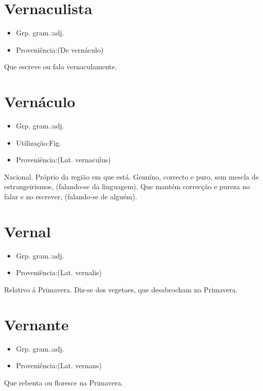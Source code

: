 \documentclass{article}
\begin{document}
\section{Vernaculista}
\begin{itemize}
\item {Grp. gram.:adj.}
\end{itemize}
\begin{itemize}
\item {Proveniência:(De \textunderscore vernáculo\textunderscore )}
\end{itemize}
Que escreve ou fala vernaculamente.
\section{Vernáculo}
\begin{itemize}
\item {Grp. gram.:adj.}
\end{itemize}
\begin{itemize}
\item {Utilização:Fig.}
\end{itemize}
\begin{itemize}
\item {Proveniência:(Lat. \textunderscore vernaculus\textunderscore )}
\end{itemize}
Nacional.
Próprio da região em que está.
Genuíno, correcto e puro, sem mescla de estrangeirismos, (falando-se da linguagem).
Que mantém correcção e pureza no falar e no escrever, (falando-se de alguém).
\section{Vernal}
\begin{itemize}
\item {Grp. gram.:adj.}
\end{itemize}
\begin{itemize}
\item {Proveniência:(Lat. \textunderscore vernalis\textunderscore )}
\end{itemize}
Relativo á Primavera.
Diz-se dos vegetaes, que desabrocham na Primavera.
\section{Vernante}
\begin{itemize}
\item {Grp. gram.:adj.}
\end{itemize}
\begin{itemize}
\item {Proveniência:(Lat. \textunderscore vernans\textunderscore )}
\end{itemize}
Que rebenta ou floresce na Primavera.
\end{document}
